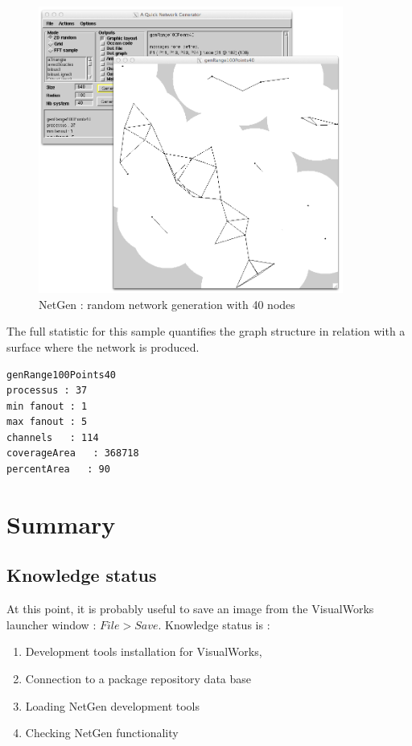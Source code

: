 \documentclass[times]{book}
\begin{document}
\begin{figure}[hbtp]
\begin{center} 
\includegraphics[width=10cm]{netgen-commented.png}
\caption{NetGen : random network generation with 40 nodes}
\label{fig:netgen-commented}
\end{center}
\end{figure}

The full statistic for this sample quantifies the graph structure in relation with a surface
where the network is produced.

\begin{lstlisting}  
genRange100Points40
processus : 37
min fanout : 1
max fanout : 5
channels   : 114
coverageArea   : 368718
percentArea   : 90
\end{lstlisting}
\section {Summary }

\subsection{Knowledge status}
At this point, it is  probably useful to save an image from the VisualWorks launcher window : $File>Save$.
Knowledge  status is :
\begin{enumerate}
\item Development tools installation for VisualWorks,
\item Connection to a package repository data base
\item Loading NetGen development tools
\item Checking NetGen functionality
\end{enumerate}
\end{document}

